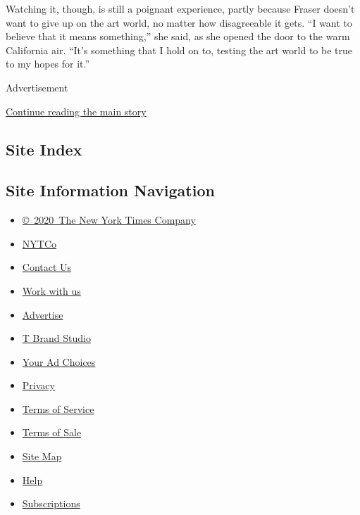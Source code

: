 Watching it, though, is still a poignant experience, partly because
Fraser doesn't want to give up on the art world, no matter how
disagreeable it gets. ``I want to believe that it means something,'' she
said, as she opened the door to the warm California air. ``It's
something that I hold on to, testing the art world to be true to my
hopes for it.''

Advertisement

\protect\hyperlink{after-bottom}{Continue reading the main story}

\hypertarget{site-index}{%
\subsection{Site Index}\label{site-index}}

\hypertarget{site-information-navigation}{%
\subsection{Site Information
Navigation}\label{site-information-navigation}}

\begin{itemize}
\tightlist
\item
  \href{https://help.nytimes3xbfgragh.onion/hc/en-us/articles/115014792127-Copyright-notice}{©~2020~The
  New York Times Company}
\end{itemize}

\begin{itemize}
\tightlist
\item
  \href{https://www.nytco.com/}{NYTCo}
\item
  \href{https://help.nytimes3xbfgragh.onion/hc/en-us/articles/115015385887-Contact-Us}{Contact
  Us}
\item
  \href{https://www.nytco.com/careers/}{Work with us}
\item
  \href{https://nytmediakit.com/}{Advertise}
\item
  \href{http://www.tbrandstudio.com/}{T Brand Studio}
\item
  \href{https://www.nytimes3xbfgragh.onion/privacy/cookie-policy\#how-do-i-manage-trackers}{Your
  Ad Choices}
\item
  \href{https://www.nytimes3xbfgragh.onion/privacy}{Privacy}
\item
  \href{https://help.nytimes3xbfgragh.onion/hc/en-us/articles/115014893428-Terms-of-service}{Terms
  of Service}
\item
  \href{https://help.nytimes3xbfgragh.onion/hc/en-us/articles/115014893968-Terms-of-sale}{Terms
  of Sale}
\item
  \href{https://spiderbites.nytimes3xbfgragh.onion}{Site Map}
\item
  \href{https://help.nytimes3xbfgragh.onion/hc/en-us}{Help}
\item
  \href{https://www.nytimes3xbfgragh.onion/subscription?campaignId=37WXW}{Subscriptions}
\end{itemize}

